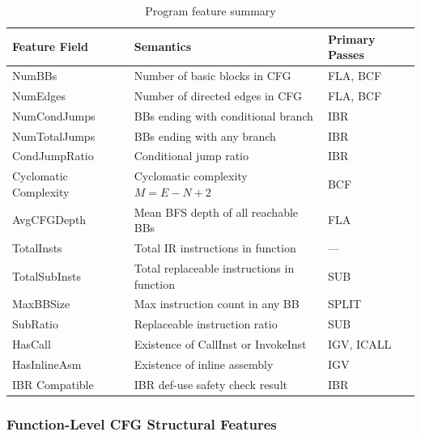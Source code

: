 \documentclass[5p,times,authoryear]{elsarticle}
\theoremstyle{plain}
\theoremstyle{definition}
\theoremstyle{remark}
\begin{document}
\begin{table}[!t]
\centering
\footnotesize
\caption{Program feature summary}
\label{tab:features}
\begin{tabular*}{\textwidth}{@{\extracolsep\fill}lll@{}}
\toprule
Feature Field & Semantics & Primary Passes  \\
\midrule
NumBBs & Number of basic blocks in CFG & FLA, BCF  \\
NumEdges & Number of directed edges in CFG & FLA, BCF  \\
NumCondJumps & BBs ending with conditional branch & IBR \\
NumTotalJumps & BBs ending with any branch & IBR \\
CondJumpRatio & Conditional jump ratio  & IBR  \\
Cyclomatic Complexity & Cyclomatic complexity $M = E - N + 2$ & BCF \\
AvgCFGDepth & Mean BFS depth of all reachable BBs & FLA  \\
TotalInsts & Total IR instructions in function & ---  \\
TotalSubInsts & Total replaceable instructions in function & SUB \\
MaxBBSize & Max instruction count in any BB & SPLIT  \\
SubRatio & Replaceable instruction ratio & SUB \\
HasCall & Existence of CallInst or InvokeInst & IGV, ICALL \\
HasInlineAsm & Existence of inline assembly & IGV \\
IBR Compatible & IBR def-use safety check result & IBR \\
\bottomrule
\end{tabular*}
\end{table}

\subsubsection{Function-Level CFG Structural Features}
\end{document}
